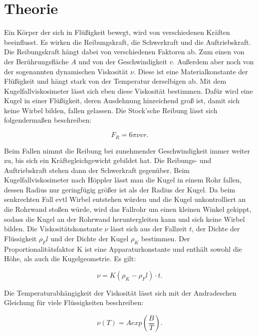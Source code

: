 \section{Theorie}
\label{sec:Theorie}

Ein Körper der sich in Flüßigkeit bewegt, wird von verschiedenen Kräften beeinflusst. Es wirken die Reibungskraft, die Schwerkraft und die Auftriebskraft. 
Die Reibungskraft hängt dabei von verschiedenen Faktoren ab. Zum einen von der Berührungsfläche $A$ und von der Geschwindigkeit $v$. 
Außerdem aber noch von der sogenannten dynamischen Viskosität $\nu$. Diese ist eine Materialkonstante der Flüßigkeit und hängt stark von der Temperatur derselbigen ab. 
Mit dem Kugelfallviskosimeter lässt sich eben diese Viskosität bestimmen. Dafür wird eine Kugel in einer Flüßigkeit, deren Ausdehnung hinreichend groß ist, damit sich keine Wirbel bilden, fallen gelassen. 
Die Stock'sche Reibung lässt sich folgendermaßen beschreiben: 

\begin{equation}
    F_R = 6\pi \nu v r.
    \label{eq:Stokes}
\end{equation}

Beim Fallen nimmt die Reibung bei zunehmender Geschwindigkeit immer weiter zu, bis sich ein Kräftegleichgewicht gebildet hat. Die Reibungs- und Auftriebskraft stehen dann der Schwerkraft gegenüber. 
Beim Kugelfallviskosimeter nach Höppler lässt man die Kugel in einem Rohr fallen, dessen Radius nur geringfügig größer ist als der Radius der Kugel. Da beim senkrechten Fall evtl Wirbel entstehen würden und die Kugel unkontrolliert an die Rohrwand stoßen würde, wird das Fallrohr um einen kleinen Winkel gekippt, sodass die Kugel an der Rohrwand heruntergleiten kann und sich keine Wirbel bilden. Die Viskositätskonstante $\nu$ lässt sich aus der Fallzeit $t$, der Dichte der Flüssigkeit $\rho_Fl$ und der Dichte der Kugel $\rho_K$ bestimmen. Der Proportionalitätsfaktor K ist eine Apparaturkonstante und enthält sowohl die Höhe, als auch die Kugelgeometrie. 
Es gilt: 

\begin{equation}
    \nu = K (\rho_K -\rho_Fl) \cdot t.
    \label{eq:nu}
\end{equation}

Die Temperaturabhängigkeit der Viskosität lässt sich mit der Andradeschen Gleichung für viele Flüssigkeiten beschreiben: 

\begin{equation}
    \nu(T) = A exp(\frac{B}{T}).
    \label{eq:Temperatur}
\end{equation}
